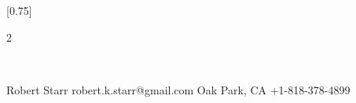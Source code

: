 \documentclass[lighthipster]{simplehipstercv}
\newlength{\rightcolwidth}
\begin{document}
\setlength{\columnsep}{1.5cm}
[0.75]
\begin{paracol}{2}

\paracolbackgroundoptions



\footnotesize
{\setasidefontcolour
\begin{center}
\end{center}
\bigskip
\bigskip



\bigskip

% 




\vspace{4em}

\\


\phantom{turn the page}

\phantom{turn the page}
}
\switchcolumn

\small


\begin{minipage}[t]{0.35\textwidth}

\end{minipage}
\begin{minipage}[t]{0.35\textwidth}

\end{minipage}
\vspace{.25 em}

\vfill{} %

\setlength{\parindent}{0pt}
\begin{minipage}[t]{\rightcolwidth}
\begin{center}\fontfamily{\sfdefault}\selectfont \color{black!70} {\small Robert
Starr  robert.k.starr@gmail.com
 Oak Park, CA 
+1-818-378-4899 \newline
}
\end{center}
\end{minipage}
\clearpage
\end{paracol}
\end{document}
